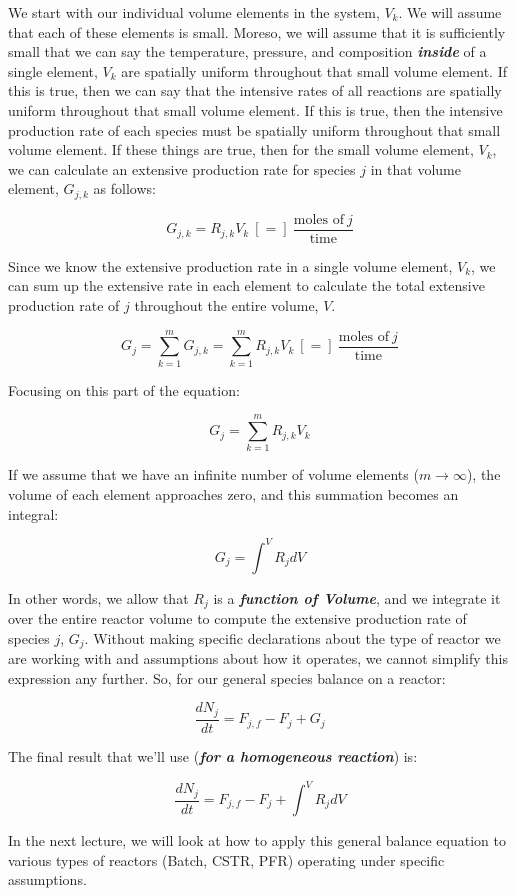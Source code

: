 \documentclass[11pt]{article}
\begin{document}
We start with our individual volume elements in the system, \(V_k\). We
will assume that each of these elements is small. Moreso, we will assume
that it is sufficiently small that we can say the temperature, pressure,
and composition \textbf{\emph{inside}} of a single element, \(V_k\) are
spatially uniform throughout that small volume element. If this is true,
then we can say that the intensive rates of all reactions are spatially
uniform throughout that small volume element. If this is true, then the
intensive production rate of each species must be spatially uniform
throughout that small volume element. If these things are true, then for
the small volume element, \(V_k\), we can calculate an extensive
production rate for species \(j\) in that volume element, \(G_{j,k}\) as
follows:

\[G_{j,k} = R_{j,k} V_k \ [=] \ \frac{\text{moles of} \ j}{\text{time}} \]

Since we know the extensive production rate in a single volume element,
\(V_k\), we can sum up the extensive rate in each element to calculate
the total extensive production rate of \(j\) throughout the entire
volume, \(V\).

\[G_{j} = \sum_{k = 1}^{m} G_{j,k} = \sum_{k = 1}^{m} R_{j,k} V_k \ [=] \ \frac{\text{moles of} \ j}{\text{time}} \]

Focusing on this part of the equation:

\[G_{j} = \sum_{k = 1}^{m} R_{j,k} V_k\]

If we assume that we have an infinite number of volume elements
(\(m \longrightarrow \infty\)), the volume of each element approaches
zero, and this summation becomes an integral:

\[G_{j} = \int^{V} R_j dV\]

In other words, we allow that \(R_j\) is a \textbf{\emph{function of
Volume}}, and we integrate it over the entire reactor volume to compute
the extensive production rate of species \(j\), \(G_j\). Without making
specific declarations about the type of reactor we are working with and
assumptions about how it operates, we cannot simplify this expression
any further. So, for our general species balance on a reactor:

\[\frac{dN_j}{dt} = F_{j,f} - F_j + G_j\]

The final result that we'll use (\textbf{\emph{for a homogeneous
reaction}}) is:

\[\frac{dN_j}{dt} = F_{j,f} - F_j + \int^{V} R_j dV\]

In the next lecture, we will look at how to apply this general balance
equation to various types of reactors (Batch, CSTR, PFR) operating under
specific assumptions.


    
    
    
\end{document}

